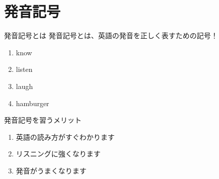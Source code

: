 \documentclass[aspectratio=169,xcolor={dvipsnames,table}]{beamer}
\begin{document}
\section{発音記号}
\begin{frame}[plain]{発音記号とは}
 発音記号とは、英語の発音を正しく表すための記号！

\begin{enumerate}
 \item<2-> know\hspace{46pt}
 \item<4-> listen\hspace{42pt} 
 \item<6-> laugh\hspace{42pt} 
 \item<8-> hamburger\hspace{15pt} 

\end{enumerate}
\end{frame}
\begin{frame}[plain]{発音記号を習うメリット}
 \begin{enumerate}
  \item<2-> 英語の読み方がすぐわかります
  \item<3-> リスニングに強くなります
  \item<4-> 発音がうまくなります
 \end{enumerate}

\bigskip

\end{frame}
\end{document}
